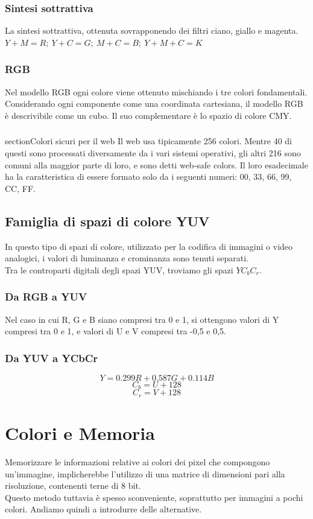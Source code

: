 \documentclass{report}
\begin{document}
	\subsection{Sintesi sottrattiva}
	La sintesi sottrattiva, ottenuta sovrapponendo dei filtri ciano, giallo e magenta.
	$Y+M=R; \ Y + C = G; \ M + C = B; \ Y+M+C = K$
	\subsection{RGB}
	Nel modello RGB ogni colore viene ottenuto mischiando i tre colori fondamentali. Considerando ogni componente come una coordinata cartesiana, il modello RGB è descrivibile come un cubo. Il suo complementare è lo spazio di colore CMY.
	\subsection{}section{Colori sicuri per il web}
	Il web usa tipicamente 256 colori. Mentre 40 di questi sono processati diversamente da i vari sistemi operativi, gli altri 216 sono comuni alla maggior parte di loro, e sono detti web-safe colors.
	Il loro esadecimale ha la caratteristica di essere formato solo da i seguenti numeri: 00, 33, 66, 99, CC, FF.
	\section{Famiglia di spazi di colore YUV}
	In questo tipo di spazi di colore, utilizzato per la codifica di immagini o video analogici, i valori di luminanza e crominanza sono tenuti separati.\\
	Tra le controparti digitali degli spazi YUV, troviamo gli spazi $YC_bC_r$.
	\subsection{Da RGB a YUV}
	Nel caso in cui R, G e B siano compresi tra 0 e 1, si ottengono valori di Y compresi tra 0 e 1, e valori di U e V compresi tra -0,5 e 0,5.
	\subsection{Da YUV a YCbCr}
	$$
	Y = 0.299R + 0.587G + 0.114B
	$$
	$$
	C_b = U + 128
	$$
	$$
	C_r = V + 128
	$$
	\newpage
	\chapter{Colori e Memoria}
	Memorizzare le informazioni relative ai colori dei pixel che compongono \\un'immagine, implicherebbe l'utilizzo di una matrice di dimensioni pari alla risoluzione, contenenti terne di 8 bit. \\
	Questo metodo tuttavia è spesso sconveniente, soprattutto per immagini a pochi colori. Andiamo quindi a introdurre delle alternative.
\end{document}
